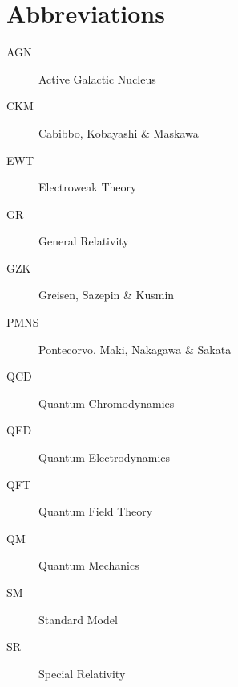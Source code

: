 \chapter*{Abbreviations}
\label{ch:abbreviations}

\begin{description}
	\item[AGN] Active Galactic Nucleus
	\item[CKM] Cabibbo, Kobayashi \& Maskawa
	\item[EWT] Electroweak Theory
	\item[GR] General Relativity
	\item[GZK] Greisen, Sazepin \& Kusmin
	\item[PMNS] Pontecorvo, Maki, Nakagawa \& Sakata
	\item[QCD] Quantum Chromodynamics
	\item[QED] Quantum Electrodynamics
	\item[QFT] Quantum Field Theory
	\item[QM] Quantum Mechanics
	\item[SM] Standard Model
	\item[SR] Special Relativity
\end{description}
